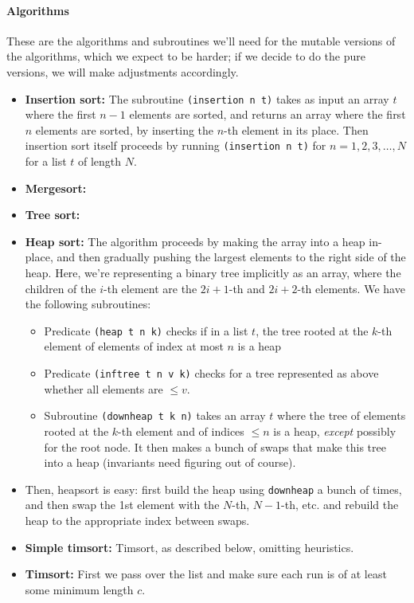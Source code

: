 \documentclass{article}
\begin{document}
\paragraph{Algorithms}
These are the algorithms and subroutines we'll need for the mutable versions of the algorithms, which we expect to be harder; if we decide to do the pure versions, we will make adjustments accordingly.
\begin{itemize}
  \item \textbf{Insertion sort:} The subroutine \verb|(insertion n t)| takes as input an array $t$ where the first $n-1$ elements are sorted, and returns an array where the first $n$ elements are sorted, by inserting the $n$-th element in its place. Then insertion sort itself proceeds by running \verb|(insertion n t)| for $n=1,2,3,\ldots,N$ for a list $t$ of length $N$. 
  \item \textbf{Mergesort:} 
  \item \textbf{Tree sort:}
  \item \textbf{Heap sort:} The algorithm proceeds by making the array into a heap in-place, and then gradually pushing the largest elements to the right side of the heap. Here, we're representing a binary tree implicitly as an array, where the children of the $i$-th element are the $2i+1$-th and $2i+2$-th elements. We have the following subroutines:
  \begin{itemize}
	\item Predicate \verb|(heap t n k)| checks if in a list $t$, the tree rooted at the $k$-th element of elements of index at most $n$ is a heap
	\item Predicate \verb|(inftree t n v k)| checks for a tree represented as above whether all elements are $\leq v$.
	\item Subroutine \verb|(downheap t k n)| takes an array $t$ where the tree of elements rooted at the $k$-th element and of indices $\leq n$ is a heap, \emph{except} possibly for the root node. It then makes a bunch of swaps that make this tree into a heap (invariants need figuring out of course). 
\end{itemize}
	
	\item Then, heapsort is easy: first build the heap using \verb|downheap| a bunch of times, and then swap the 1st element with the $N$-th, $N-1$-th, etc. and rebuild the heap to the appropriate index between swaps.
  \item \textbf{Simple timsort:}
    Timsort, as described below, omitting heuristics.
  \item \textbf{Timsort:}
	  First we pass over the list and make sure each run is of at
    least some minimum length $c$.


\end{itemize}
\end{document}
